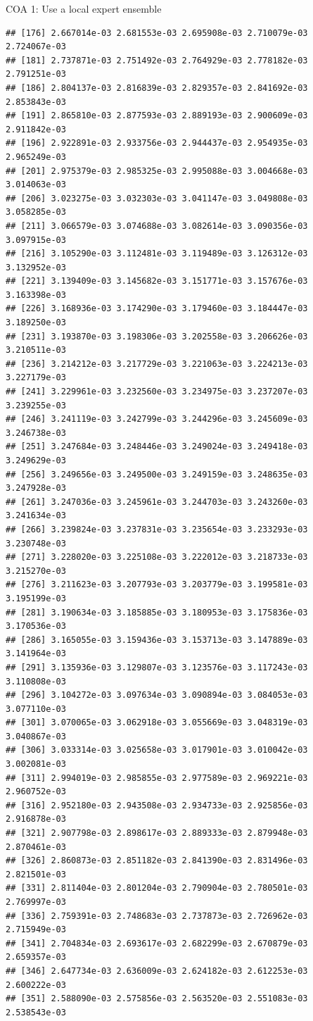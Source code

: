 \documentclass[ignorenonframetext,]{beamer}
\begin{document}
\begin{frame}[fragile]{COA 1: Use a local expert ensemble}
\begin{verbatim}
## [176] 2.667014e-03 2.681553e-03 2.695908e-03 2.710079e-03 2.724067e-03
## [181] 2.737871e-03 2.751492e-03 2.764929e-03 2.778182e-03 2.791251e-03
## [186] 2.804137e-03 2.816839e-03 2.829357e-03 2.841692e-03 2.853843e-03
## [191] 2.865810e-03 2.877593e-03 2.889193e-03 2.900609e-03 2.911842e-03
## [196] 2.922891e-03 2.933756e-03 2.944437e-03 2.954935e-03 2.965249e-03
## [201] 2.975379e-03 2.985325e-03 2.995088e-03 3.004668e-03 3.014063e-03
## [206] 3.023275e-03 3.032303e-03 3.041147e-03 3.049808e-03 3.058285e-03
## [211] 3.066579e-03 3.074688e-03 3.082614e-03 3.090356e-03 3.097915e-03
## [216] 3.105290e-03 3.112481e-03 3.119489e-03 3.126312e-03 3.132952e-03
## [221] 3.139409e-03 3.145682e-03 3.151771e-03 3.157676e-03 3.163398e-03
## [226] 3.168936e-03 3.174290e-03 3.179460e-03 3.184447e-03 3.189250e-03
## [231] 3.193870e-03 3.198306e-03 3.202558e-03 3.206626e-03 3.210511e-03
## [236] 3.214212e-03 3.217729e-03 3.221063e-03 3.224213e-03 3.227179e-03
## [241] 3.229961e-03 3.232560e-03 3.234975e-03 3.237207e-03 3.239255e-03
## [246] 3.241119e-03 3.242799e-03 3.244296e-03 3.245609e-03 3.246738e-03
## [251] 3.247684e-03 3.248446e-03 3.249024e-03 3.249418e-03 3.249629e-03
## [256] 3.249656e-03 3.249500e-03 3.249159e-03 3.248635e-03 3.247928e-03
## [261] 3.247036e-03 3.245961e-03 3.244703e-03 3.243260e-03 3.241634e-03
## [266] 3.239824e-03 3.237831e-03 3.235654e-03 3.233293e-03 3.230748e-03
## [271] 3.228020e-03 3.225108e-03 3.222012e-03 3.218733e-03 3.215270e-03
## [276] 3.211623e-03 3.207793e-03 3.203779e-03 3.199581e-03 3.195199e-03
## [281] 3.190634e-03 3.185885e-03 3.180953e-03 3.175836e-03 3.170536e-03
## [286] 3.165055e-03 3.159436e-03 3.153713e-03 3.147889e-03 3.141964e-03
## [291] 3.135936e-03 3.129807e-03 3.123576e-03 3.117243e-03 3.110808e-03
## [296] 3.104272e-03 3.097634e-03 3.090894e-03 3.084053e-03 3.077110e-03
## [301] 3.070065e-03 3.062918e-03 3.055669e-03 3.048319e-03 3.040867e-03
## [306] 3.033314e-03 3.025658e-03 3.017901e-03 3.010042e-03 3.002081e-03
## [311] 2.994019e-03 2.985855e-03 2.977589e-03 2.969221e-03 2.960752e-03
## [316] 2.952180e-03 2.943508e-03 2.934733e-03 2.925856e-03 2.916878e-03
## [321] 2.907798e-03 2.898617e-03 2.889333e-03 2.879948e-03 2.870461e-03
## [326] 2.860873e-03 2.851182e-03 2.841390e-03 2.831496e-03 2.821501e-03
## [331] 2.811404e-03 2.801204e-03 2.790904e-03 2.780501e-03 2.769997e-03
## [336] 2.759391e-03 2.748683e-03 2.737873e-03 2.726962e-03 2.715949e-03
## [341] 2.704834e-03 2.693617e-03 2.682299e-03 2.670879e-03 2.659357e-03
## [346] 2.647734e-03 2.636009e-03 2.624182e-03 2.612253e-03 2.600222e-03
## [351] 2.588090e-03 2.575856e-03 2.563520e-03 2.551083e-03 2.538543e-03

\end{verbatim}
\end{frame}
\end{document}
